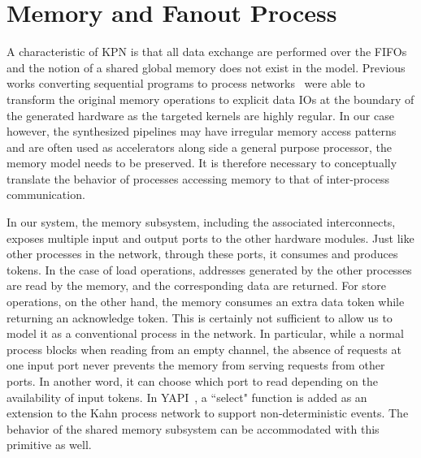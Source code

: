 \section{Memory and Fanout Process}
\label{mp}
A characteristic
of KPN is that all data exchange are performed over the FIFOs and the notion of
a shared global memory does not exist in the model. Previous works
converting sequential programs to process networks~\cite{mat2pn}\cite{c2stream}
were able to transform the original memory operations to explicit data IOs
at the boundary of the generated hardware as the targeted kernels are highly 
regular. In our case however, the synthesized pipelines may have irregular memory access patterns and are often used as accelerators along side a general purpose processor, the memory model needs to be preserved. It is therefore necessary to conceptually
translate the behavior of processes accessing memory to that of inter-process
communication.


In our system, the memory subsystem, including the associated interconnects, exposes multiple
input and output ports to the other hardware modules. 
Just like other processes in the network, through these ports, it consumes and produces tokens. In the case of load operations, addresses generated by the other processes
are read by the memory, and the corresponding data are returned. For store operations, on the other hand, the memory
consumes an extra data token while returning an acknowledge token.
This is certainly not sufficient to allow us to model it as
a conventional process in the network.
In particular, while a normal process blocks when reading from an empty
channel, the absence of requests at one input port never prevents the memory from serving requests from other ports. In another word, it can choose
which port to read depending on the availability of input tokens.
In YAPI~\cite{}, a ``select" function is added as an extension to the Kahn process network to support non-deterministic events. The behavior of
the shared memory subsystem can be accommodated with this primitive as well. 


